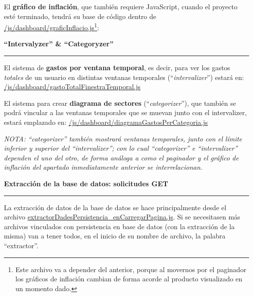 \documentclass[a4paper,12pt]{report}
\begin{document}
	El \textbf{gráfico de inflación}, que también requiere JavaScript, cuando el proyecto esté terminado, tendrá su base de código dentro de \href{https://github.com/blackcub3s/mercApp/blob/main/APP%20WEB/__frontend__produccio__/app/js/dashboard/graficInflacio.js}{/js/dashboard/graficInflacio.js}\footnote{Este archivo va a depender del anterior, porque al movernos por el paginador los gráficos de inflación cambian de forma acorde al producto visualizado en un momento dado.}:
	
	\noindent \textbf{``Intervalyzer'' \& ``Categoryzer''}
	\hrule
	\vspace{.5em}
	
	El sistema de \textbf{gastos por ventana temporal}, es decir, para ver los gastos \textit{totales} de un usuario en distintas ventanas temporales (``\textit{intervalizer}'') estará en: \href{https://github.com/blackcub3s/mercApp/blob/main/APP%20WEB/__frontend__produccio__/app/js/dashboard/gastoTotalFinestraTemporal.js}{/js/dashboard/gastoTotalFinestraTemporal.js}
	
	
	El sistema para crear \textbf{diagrama de sectores} (``\textit{categorizer}''), que también se podrá vincular a las ventanas temporales que se muevan junto con el intervalizer, estará emplazado en:  \href{https://github.com/blackcub3s/mercApp/blob/main/APP%20WEB/__frontend__produccio__/app/js/dashboard/diagramaGastosPerCategoria.js}{/js/dashboard/diagramaGastosPerCategoria.js}
	


	
	\textit{NOTA:  ``categorizer'' también mostrará ventanas temporales, junto con el límite inferior y superior del ``intervalizer''; con lo cual ``categorizer'' e ``intervalizer'' dependen el uno del otro, de forma  análoga a como el paginador y el gráfico de inflación del apartado inmediatamente anterior se interrelacionan.}
	
	 \noindent \textbf{Extracción de la base de datos: solicitudes GET}
	 \hrule
	 \vspace{.5em}
	
	
	La extracción de datos de la base de datos se hace principalmente desde el archivo \href{	https://github.com/blackcub3s/mercApp/blob/main/APP%20WEB/__frontend__produccio__/app/js/dashboard/extractorDadesPersistencia_enCarregarPagina.js}{extractorDadesPersistencia\_enCarregarPagina.js}. Si se necesitasen más archivos vinculados con persistencia en base de datos (con la extracción de la misma) van a tener todos, en el inicio de su nombre de archivo, la palabra ``extractor''.
\end{document}
